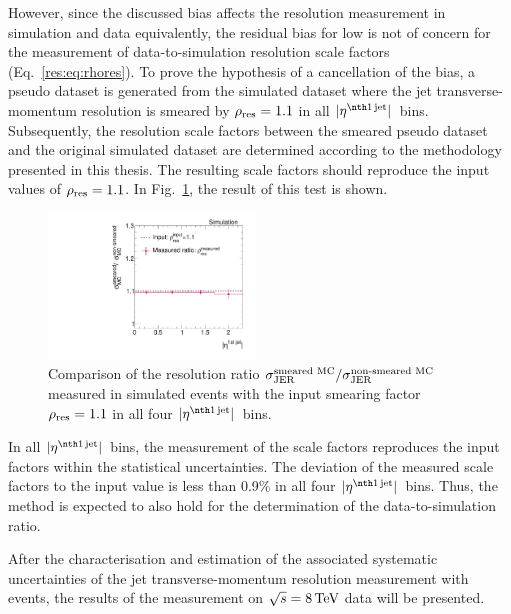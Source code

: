 However, since the discussed bias affects the resolution measurement in simulation and data equivalently, the residual bias for low \ptgamma is not of concern for the measurement of data-to-simulation resolution scale factors \rhores (Eq.~\eqref{res:eq:rhores}). 
To prove the hypothesis of a cancellation of the bias, a pseudo dataset is generated from the simulated dataset where the jet transverse-momentum resolution is smeared by $\rho_\mathrm{res} =1.1$ in all $|\etafirstjet|$~bins. 
Subsequently, the resolution scale factors between the smeared pseudo dataset and the original simulated dataset are determined according to the methodology presented in this thesis.
The resulting scale factors \rhores should reproduce the input values of $\rho_\mathrm{res}=1.1$.
In Fig.~\ref{res:fig:MCClosureRatio}, the result of this test is shown.
\begin{figure}[~t]
  \centering
    \includegraphics[width=0.49\textwidth]{figures/resolution/methodology/MCClosureRatio.pdf}
     \caption{Comparison of the resolution ratio $\sigma_\mathrm{JER}^{\text{smeared MC}}/\sigma_\mathrm{JER}^{\text{non-smeared MC}}$ measured in simulated events with the input smearing factor $\rho_\mathrm{res}=1.1$ in all four $|\etafirstjet|$~bins.}
  \label{res:fig:MCClosureRatio}
\end{figure}
In all $|\etafirstjet|$~bins, the measurement of the scale factors reproduces the input factors within the statistical uncertainties.
The deviation of the measured scale factors to the input value is less than 0.9\% in all four $|\etafirstjet|$~bins.
Thus, the method is expected to also hold for the determination of the data-to-simulation ratio.

After the characterisation and estimation of the associated systematic uncertainties of the jet transverse-momentum resolution measurement with \GAMJET events, the results of the measurement on $\sqrt{s}=8\,\text{Te}\kern-0.06667em\text{V}$ data will be presented.
\FloatBarrier
